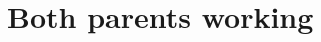 \begin{subappendices}
\begin{table}[H]
{\begin{tabular}{lccccc}
\bottomrule
\end{tabular}
}
\end{table}   



\section{Both parents working}



\end{subappendices}
